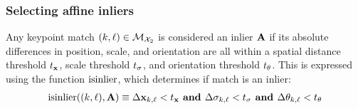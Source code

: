         \subsubsection{Selecting affine inliers}
            Any keypoint match $(k, \ell) \in \mathcal{M}_{\mathcal{X}_{2}}$  is considered an inlier \wrt{} $\mathbf{A}$
            if its absolute differences in position, scale, and orientation are all within a spatial distance
            threshold $t_{\mathbf{x}}$, scale threshold $t_{{\sigma}}$, and orientation threshold $t_{{\theta}}$. This is
            expressed using the function $\operatorname{isinlier}$, which determines if match is an inlier:
            \begin{equation}\label{eqn:inlierchecks}
                \begin{gathered}
                    \operatorname{isinlier}((k, \ell), \mathbf{A})  \equiv  
                        \Delta \mathbf{x}_{k, \ell} < t_{\mathbf{x}} \textbf{ and } 
                        \Delta \sigma_{k, \ell} < t_{{\sigma}} \textbf{ and } 
                        \Delta \theta_{k, \ell} < t_{{\theta}}
                \end{gathered}
            \end{equation}
